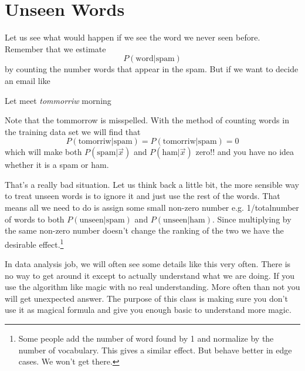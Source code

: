 \documentclass[a4paper, 12pt]{article}
\begin{document}
\section*{Unseen Words}

Let us see what would happen if we see the word we never seen before. Remember that we estimate
\[
	P(\text{word} | \text{spam})
\]
by counting the number words that appear in the spam. But if we want to decide an email like 
\begin{center}
	Let meet \emph{tommorriw} morning
\end{center}
Note that the tommorrow is misspelled. With the method of counting words in the training data set we will find that
\[
	P(\text{tomorriw} | \text{spam})=P(\text{tomorriw} | \text{spam})=0
\]
which will make both $P(\text{spam}|\vec{x})$ and $P(\text{ham}|\vec{x})$ zero!! and you have no idea whether it is a spam or ham.

That's a really bad situation. Let us think back a little bit, the more sensible way to treat unseen words is to ignore it and just use the rest of the words. That means all we need to do is assign some small non-zero number e.g. 1/totalnumber of words to both $P(\text{unseen}|\text{spam})$ and $P(\text{unseen}|\text{ham})$. Since multiplying by the same non-zero number doesn't change the ranking of the two we have the desirable effect.\footnote{Some people add the number of word found by 1 and normalize by the number of vocabulary. This gives a similar effect. But behave better in edge cases. We won't get there.}


In data analysis job, we will often see some details like this very often. There is no way to get around it except to actually understand what we are doing. If you use the algorithm like magic with no real understanding. More often than not you will get unexpected answer. The purpose of this class is making sure you don't use it as magical formula and give you enough basic to understand more magic.
\end{document}
